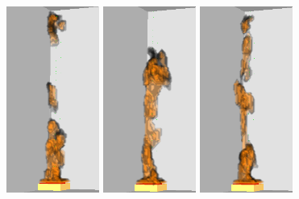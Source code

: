 \documentclass[twoside]{uocthesis}
\begin{document}
{\begin{figure}[p]
	\includegraphics[width=1.2in]{../Figures/FDSNG_Corner7}
	\includegraphics[width=1.2in]{../Figures/FDSNG_Corner8}
	\includegraphics[width=1.2in]{../Figures/FDSNG_Corner9} \\
	

\end{figure}}
\end{document}
